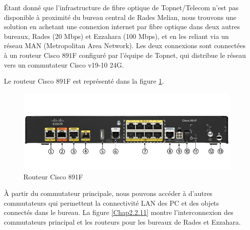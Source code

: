 Étant donné que l'infrastructure de fibre optique de Topnet/Telecom n'est pas disponible à proximité du bureau central de Rades Melian, nous trouvons une solution en achetant une connexion internet par fibre optique dans deux autres bureaux, Rades (20 Mbps) et Ezzahara (100 Mbps), et en les reliant via un réseau MAN (Metropolitan Area Network). Les deux connexions sont connectées à un routeur Cisco 891F configuré par l'équipe de Topnet, qui distribue le réseau vers un commutateur Cisco v19-10 24G. 


Le routeur Cisco 891F est représenté dans la figure \ref{Chap2.2.10}.

\begin{figure}[H]
\centering
\includegraphics[width=15cm]{Images/C891F_1.jpg}
\caption{Routeur Cisco 891F}
\label{Chap2.2.10}
\end{figure}

À partir du commutateur principale, nous pouvons accéder à d'autres commutateurs qui permettent la connectivité LAN des PC et des objets connectés dans le bureau. La figure \ref{Chap2.2.11} montre l'interconnexion des commutateurs principal et les routeurs pour les bureaux de Rades et Ezzahara.



